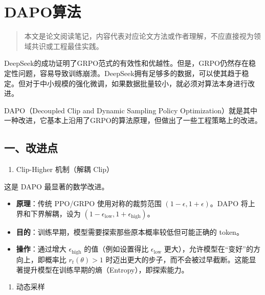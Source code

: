 \setcounter{section}{0}

\hypertarget{dapoux7b97ux6cd5}{%
\section{DAPO算法}\label{dapoux7b97ux6cd5}}

\begin{quote}
本文是论文阅读笔记，内容代表对应论文方法或作者理解，不应直接视为领域共识或工程最佳实践。
\end{quote}

DeepSeek的成功证明了GRPO范式的有效性和优越性。但是，GRPO仍然存在稳定性问题，容易导致训练崩溃。DeepSeek拥有足够多的数据，可以使其趋于稳定。但对于中小规模的强化微调，如果数据批量较小，就必须对算法本身进行改进。

DAPO（Decoupled Clip and Dynamic Sampling Policy Optimization）就是其中一种改进，它基本上沿用了GRPO的算法原理，但做出了一些工程策略上的改进。

\hypertarget{ux4e00ux6539ux8fdbux70b9}{%
\subsection{一、改进点}\label{ux4e00ux6539ux8fdbux70b9}}

\begin{enumerate}
\def\labelenumi{\arabic{enumi}.}
\tightlist
\item
  Clip-Higher 机制（解耦 Clip）
\end{enumerate}

这是 DAPO 最显著的数学改进。

\begin{itemize}
\tightlist
\item
  \textbf{原理}：传统 PPO/GRPO 使用对称的裁剪范围 \((1-\epsilon, 1+\epsilon)\)。DAPO 将上界和下界解耦，设为 \((1-\epsilon_{\mathrm{low}}, 1+\epsilon_{\mathrm{high}})\)。
\item
  \textbf{目的}：训练早期，模型需要探索那些原本概率较低但可能正确的 token。
\item
  \textbf{操作}：通过增大 \(\epsilon_{\mathrm{high}}\) 的值（例如设置得比 \(\epsilon_{\mathrm{low}}\) 更大），允许模型在``变好''的方向上，即概率比 \(r_t(\theta)>1\) 时迈出更大的步子，而不会被过早截断。这能显著提升模型在训练早期的熵（Entropy），即探索能力。
\end{itemize}

\begin{enumerate}
\def\labelenumi{\arabic{enumi}.}
\setcounter{enumi}{1}
\tightlist
\item
  动态采样
\end{enumerate}

